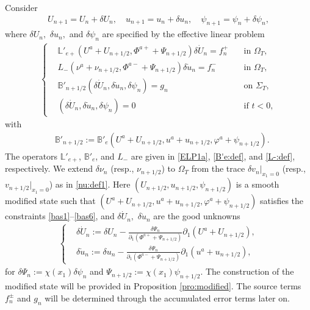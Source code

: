 \documentclass[twoside,11pt]{article}
\numberwithin{equation}{section}
\def\p{\partial}
\begin{document}
\vspace*{1mm}

Consider
\begin{align}\label{NM0}
	U_{{n}+1}=U_{{n}}+\delta U_{{n}},
	\quad u_{n+1}=u_n+\delta u_{n},
	\quad \psi_{{n}+1}=\psi_{{n}}+\delta \psi_{{n}},
\end{align}
where %
$\delta U_{{n}},$ $\delta u_{{n}},$ and $\delta \psi_{{n}}$ are specified by the effective linear problem
\begin{align}
	\left\{\begin{aligned}
		&\mathbb{L}'_{e+}(U^a+U_{n+1/2},\Phi^{a+}+\Psi_{n+1/2})\delta \dot{U}_{{n}}=f_{{n}}^+
		&\ &\textrm{in } \Omega_T, \\
		&L_-(\nu^a+\nu_{n+1/2}, \Phi^{a-}+\Psi_{n+1/2})\delta \dot{u}_{{n}}=f_{{n}}^-
		&&\textrm{in } \Omega_T, \\
		& \mathbb{B}'_{n+1/2}(\delta \dot{U}_{{n}}, \delta\dot{u}_{{n}},\delta\psi_n)=g_n
		&&\textrm{on } \Sigma_T ,\\
		&(\delta \dot{U}_{{n}},\delta \dot{u}_{{n}},\delta\psi_{{n}}) =0 &&
		\textrm{if } t<0,
	\end{aligned} \right.
	\label{effective.NM}
\end{align}
with
\begin{align}
	\label{B.bb':2}
	&\mathbb{B}'_{n+1/2}:=\mathbb{B}'_{e}(U^a+U_{n+1/2},u^a+u_{n+1/2}, \varphi^a+\psi_{n+1/2}).
\end{align}
The operators $\mathbb{L}'_{e+}$, $\mathbb{B}'_{e}$, and $L_-$ are given in \eqref{ELP1a}, \eqref{B'e:def}, and \eqref{L-:def}, respectively.
We extend $\delta \nu_n$ (resp., $\nu_{n+1/2}$) to $\Omega_{T}$ from the trace $\delta v_n|_{x_1=0}$ (resp., $v_{n+1/2}|_{x_1=0}$) as in \eqref{nu:def1}.
Here $(U_{n+1/2},u_{n+1/2}, \psi_{n+1/2})$ is a smooth modified state such that $(U^a+U_{n+1/2},u^a+u_{n+1/2},\varphi^a+\psi_{n+1/2})$ satisfies the constraints \eqref{bas1}--\eqref{bas6},
and $\delta \dot{U}_{{n}},$ $\delta \dot{u}_{{n}}$ are the good unknowns %
\begin{align}
	\label{good.NM}
	\left\{
	\begin{aligned}
		&\delta \dot{U}_{{n}}:=\delta U_{{n}}-\frac{\delta\Psi_{{n}}}{\p_1 (\Phi^{a+}+\Psi_{n+1/2})}\p_1 (U^a+U_{n+1/2}), \\[0.3mm]
		&
		\delta \dot{u}_{{n}}:=\delta u_{{n}}-\frac{\delta\Psi_{{n}}}{\p_1 (\Phi^{a-}+\Psi_{n+1/2})}\p_1 (u^a+u_{n+1/2}),
	\end{aligned}
	\right.
\end{align}
for $\delta\Psi_{{n}}:=\chi(x_1)\delta \psi_{{n}}$ and $\Psi_{n+1/2}:=\chi(x_1)\psi_{n+1/2}$.
The construction of the modified state will be provided in Proposition \ref{pro:modified}.
The source terms $f_n^{\pm}$ and $g_n$ will be determined through the accumulated error terms later on.
\end{document}

